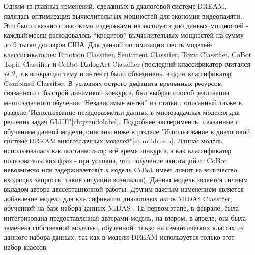 Одним из главных изменений, сделанных в диалоговой системе DREAM, являлась оптимизация вычислительных мощностей для экономии видеопамяти. Это было связано с высокими издержками на эксплуатацию данных мощностей - каждый месяц расходовалось “кредитов” вычислительных мощностей на сумму до 9 тысяч долларов США. Для данной оптимизации шесть моделей-классификаторов: Emotion Classifier, Sentiment Classifier, Toxic Classifier, CoBot Topic Classifier и CoBot DialogAct Classifier (последний классификатор считался за 2, т.к возвращал тему и интент) были объединены в один классификатор Combined Classifier. В условиях острого дефицита временных ресурсов, связанного с быстрой динамикой конкурса, был выбран способ реализации многозадачного обучения “Независимые метки” из статьи  \cite{pseudolabel}, описанный также в разделе "Использование псевдоразметки данных в многозадачных моделях для решения задач GLUE"\ref{ch:pseudolabel}. Подробнее эксперименты, связанные с обучением данной модели, описаны ниже в разделе "Использование в диалоговой системе DREAM многозадачных моделей"\ref{ch:mtldream}. Данная модель использовалась как постаннотатор всё время конкурса, а как классификатор пользовательских фраз - при условии, что получение аннотаций от CoBot невозможно или задерживается(т.к модель CoBot имеет лимит на количество входящих запросов, такие ситуации возникали),  Данная модель является личным вкладом автора диссертационной работы. 
Другим важным изменением является добавление модели для классификации диалоговых актов MIDAS Classifier, обученной на базе набора данных MIDAS \cite{midas}. На первом этапе, в феврале, была интегрирована предоставленная авторами модель, на втором, в апреле, она была заменена собственной моделью, обученной только на семантических классах из данного набора данных, так как в модели DREAM используется только этот набор классов. 

